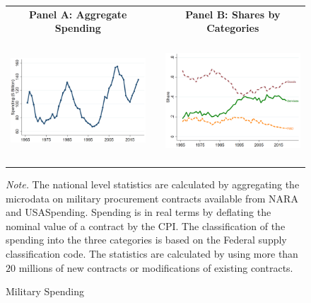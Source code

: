 \documentclass[dv_diss_main.tex]{subfiles}
\begin{document}
\begin{figure}[H]
\begin{center}
    \begin{tabular}[c]{ccc}
    
    \normalsize{\bf Panel A: Aggregate Spending} & & \normalsize{\bf Panel B: Shares by Categories} \\
    {\includegraphics[height=1.8in,width=2.9in]{figures/graph_milspend_aggregate.png}} & & {\includegraphics[height=1.8in,width=2.9in]{figures/graph_composition_shares.png}} \\[0.1in]
    
    \end{tabular}
   \caption{Military Spending}
\end{center}
    
    
    \footnotesize{\textit{Note. } The national level statistics are calculated by aggregating the microdata on military procurement contracts available from NARA and USASpending. Spending is in real terms by deflating the nominal value of a contract by the CPI. The classification of the spending into the three categories is based on the Federal supply classification code. The statistics are calculated by using more than $20$ millions of new contracts or modifications of existing contracts.}

    \label{fig:share_comp}
\end{figure}
\newpage
\end{document}
